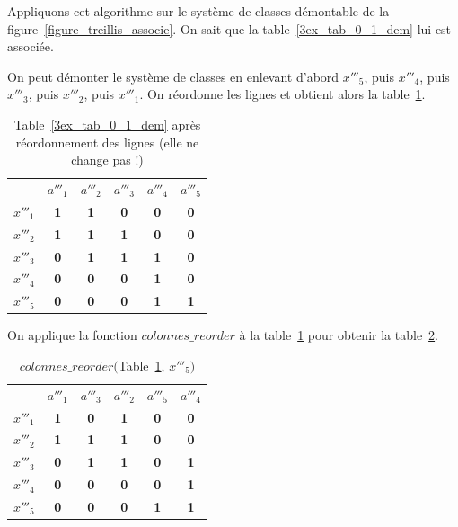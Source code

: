 \documentclass[a4paper]{report}
\renewcommand{\textbf}[1]{\begingroup\bfseries\mathversion{bold}#1\endgroup}
\begin{document}
Appliquons cet algorithme sur le système de classes démontable de la figure~\ref{figure_treillis_associe}. On sait que la table~\ref{3ex_tab_0_1_dem} lui est associée.

On peut démonter le système de classes en enlevant d'abord $x'''_5$, puis $x'''_4$, puis $x'''_3$, puis $x'''_2$, puis $x'''_1$. On réordonne les lignes et 
obtient alors la table~\ref{tablereor}.
 

\begin{table}[htb]
  \centering

\begin{tabular}{lccccc}
 & $a'''_1$ & $a'''_2$ & $a'''_3$ & $a'''_4$ & $a'''_5$\\
$x'''_1$ & \textbf{1} & \textbf{1} & \textbf{0} & \textbf{0} & \textbf{0}\\
$x'''_2$ & \textbf{1} & \textbf{1} & \textbf{1} & \textbf{0} & \textbf{0}\\
$x'''_3$ & \textbf{0} & \textbf{1} & \textbf{1} & \textbf{1} & \textbf{0}\\
$x'''_4$ & \textbf{0} & \textbf{0} & \textbf{0} & \textbf{1} & \textbf{0}\\
$x'''_5$ & \textbf{0} & \textbf{0} & \textbf{0} & \textbf{1} & \textbf{1}

\end{tabular}

\caption{Table~\ref{3ex_tab_0_1_dem} après réordonnement des lignes (elle ne change pas !)}
\label{tablereor}
\end{table}

On applique la fonction $colonnes\_reorder$ à la table~\ref{tablereor} pour obtenir la table~\ref{tablereor1}.

\begin{table}[htb]
  \centering

\begin{tabular}{lccccc}
 & $a'''_1$ & $a'''_3$ & $a'''_2$ & $a'''_5$ & $a'''_4$\\
$x'''_1$ & \textbf{1} & \textbf{0} & \textbf{1} & \textbf{0} & \textbf{0}\\
$x'''_2$ & \textbf{1} & \textbf{1} & \textbf{1} & \textbf{0} & \textbf{0}\\
$x'''_3$ & \textbf{0} & \textbf{1} & \textbf{1} & \textbf{0} & \textbf{1}\\
$x'''_4$ & \textbf{0} & \textbf{0} & \textbf{0} & \textbf{0} & \textbf{1}\\
$x'''_5$ & \textbf{0} & \textbf{0} & \textbf{0} & \textbf{1} & \textbf{1}

\end{tabular}

\caption{$colonnes\_reorder ($Table~\ref{tablereor}, $x'''_5)$}
\label{tablereor1}
\end{table}
\end{document}
